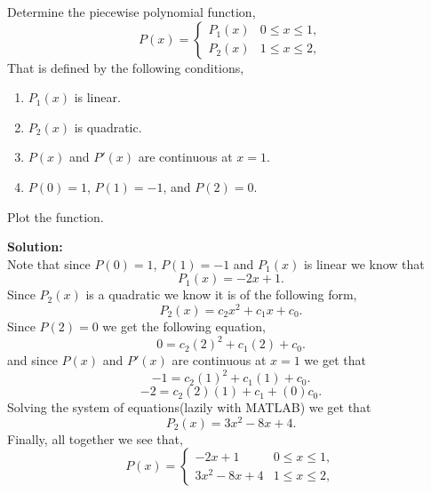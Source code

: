 \documentclass[12pt]{article}
\makeatletter
\theoremstyle{homework}
\newenvironment{exercise}[1]
{\def\@currentlabel{#1}\exercisecore}
{\endexercisecore}
\newcommand{\localhead}[1]{\par\smallskip\noindent\textbf{#1}\nobreak\\}%
\newcommand\solution{\localhead{Solution:}}
\makeatother
\begin{document}
\begin{exercise}{Text 8.9} Determine the piecewise polynomial function,
  \begin{equation*}
    P(x) = 
    \begin{cases} 
      P_1(x) & 0\leq x \leq 1, \\
      P_2(x) & 1\leq x\leq 2, 
   \end{cases}
  \end{equation*}
  That is defined by the following conditions,
  \begin{enumerate}
    \item $P_1(x)$ is linear.
    \item $P_2(x)$ is quadratic.
    \item $P(x)$ and $P'(x)$ are continuous at $x = 1$.
    \item $P(0) = 1$, $P(1) = -1$, and $P(2) = 0$.
  \end{enumerate}
  Plot the function. \\
  \solution Note that since $P(0) = 1$, $P(1) = -1$ and $P_1(x)$ is linear we know that 
  \begin{equation*}
    P_1(x) = -2x+1.
  \end{equation*}
  Since $P_2(x)$ is a quadratic we know it is of the following form,
  \begin{equation*}
    P_2(x) = c_2x^2 + c_1x + c_0.
  \end{equation*}
  Since $P(2) = 0$ we get the following equation,
  \begin{equation*}
    0 = c_2(2)^2 + c_1(2) + c_0.
  \end{equation*}
  and since $P(x)$ and $P'(x)$ are continuous at $x = 1$ we get that
  \begin{equation*}
    -1 = c_2(1)^2 + c_1(1) + c_0.
  \end{equation*}
  \begin{equation*}
    -2 = c_2(2)(1) + c_1 + (0)c_0.
  \end{equation*}
  Solving the system of equations(lazily with MATLAB) we get that
  \begin{equation*}
    P_2(x) = 3x^2  - 8x + 4.
  \end{equation*}
  Finally, all together we see that,
  \begin{equation*}
    P(x) = 
    \begin{cases} 
      -2x+1 & 0\leq x \leq 1, \\
      3x^2  - 8x + 4 & 1\leq x\leq 2, 
   \end{cases}
  \end{equation*}
\end{exercise}
\vspace{.5in}
\end{document}
